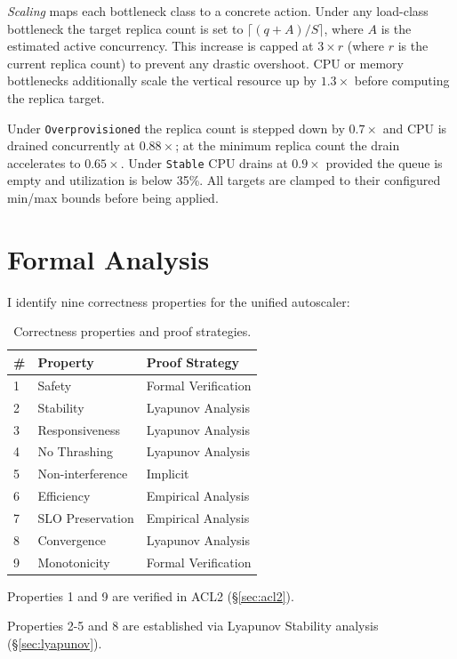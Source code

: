 \documentclass[twocolumn]{article}
\begin{document}
\emph{Scaling} maps each bottleneck class to a concrete action. Under any load-class bottleneck the target replica count is set to \(\lceil (q + A) / S \rceil\), where \(A\) is the estimated active concurrency. This increase is capped at \(3 \times r\) (where \(r\) is the current replica count) to prevent any drastic overshoot. CPU or memory bottlenecks additionally scale the vertical resource up by \(1.3\times\) before computing the replica target.

Under \texttt{Overprovisioned} the replica count is stepped down by \(0.7\times\) and CPU is drained concurrently at \(0.88\times\); at the minimum replica count the drain accelerates to \(0.65\times\). Under \texttt{Stable} CPU drains at \(0.9\times\) provided the queue is empty and utilization is below 35\%. All targets are clamped to their configured min/max bounds before being applied.
\section{Formal Analysis}
\label{sec:org13a80b3}

I identify nine correctness properties for the unified autoscaler:

\begin{table}[htbp]
\caption{\label{tab:properties}Correctness properties and proof strategies.}
\centering
\small
\begin{tabular}{lll}
\toprule
\# & Property & Proof Strategy\\
\midrule
1 & Safety & Formal Verification\\
2 & Stability & Lyapunov Analysis\\
3 & Responsiveness & Lyapunov Analysis\\
4 & No Thrashing & Lyapunov Analysis\\
5 & Non-interference & Implicit\\
6 & Efficiency & Empirical Analysis\\
7 & SLO Preservation & Empirical Analysis\\
8 & Convergence & Lyapunov Analysis\\
9 & Monotonicity & Formal Verification\\
\bottomrule
\end{tabular}
\end{table}

Properties 1 and 9 are verified in ACL2 (\S\ref{sec:acl2}).

Properties 2-5 and 8 are established via Lyapunov Stability analysis
(\S\ref{sec:lyapunov}).
\end{document}

